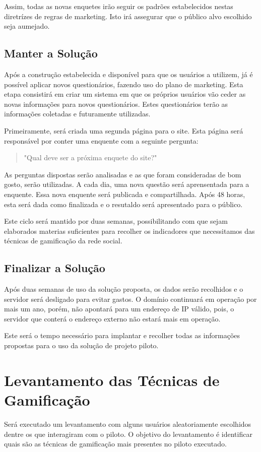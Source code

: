 Assim, todas as novas enquetes irão seguir os padrões estabelecidos nestas diretrízes de regras de marketing. Isto irá assegurar que
o público alvo escolhido seja aumejado.


\subsection{Manter a Solução}
\label{sub:definir_tecnologia}
Após a construção estabelecida e disponível para que os usuários a utilizem, já é possível aplicar novos questionários, fazendo uso do plano de marketing.
Esta etapa consistirá em criar um sistema em que os próprios usuários vão ceder as novas informações para novos questionários. Estes questionários 
terão as informações coletadas e futuramente utilizadas.

Primeiramente, será criada uma segunda página para o site. Esta página será responsável por conter uma enquente com a seguinte pergunta:

 \begin{quote}
     "Qual deve ser a próxima enquete do site?"
 \end{quote}

As perguntas dispostas serão analisadas e as que foram consideradas de bom gosto, serão utilizadas. A cada dia, uma nova questão será aprensentada
para a enquente. Essa nova enquente será publicada e compartilhada. Após 48 horas, esta será dada como finalizada e o resutaldo será apresentado
para o público. 

Este ciclo será mantido por duas semanas, possibilitando com que sejam elaborados materias suficientes para recolher os indicadores que necessitamos 
das técnicas de gamificação da rede social.
\subsection{Finalizar a Solução}
\label{sub:definir_tecnologia}

Após duas semanas de uso da solução proposta, os dados serão recolhidos e o servidor será desligado para evitar gastos. O domínio continuará em operação
por mais um ano, porém, não apontará para um endereço de IP válido, pois, o servidor que conterá o endereço externo não estará mais em operação.

Este será o tempo necessário para implantar e recolher todas as informações propostas para o uso da solução de projeto piloto.

\section{Levantamento das Técnicas de Gamificação}
\label{sub:survey_para_t_cnicas_de_gamifica_o}
Será executado um levantamento com alguns usuários aleatoriamente escolhidos dentre os que interagiram com o piloto.
O objetivo do levantamento é identificar quais são as técnicas de gamificação mais presentes no piloto executado.

